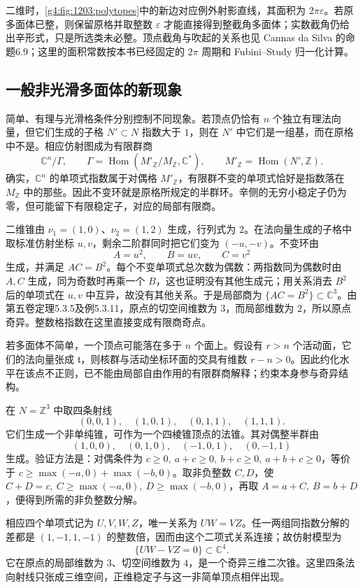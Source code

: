二维时，\cref{g4:fig:1203:polytopes}中的新边对应例外射影直线，其面积为 \(2\pi\varepsilon\)。若原多面体已整，则保留原格并取整数 \(\varepsilon\) 才能直接得到整截角多面体；实数截角仍给出辛形式，只是所选类未必整。顶点截角与吹起的关系也见 Cannas da Silva 的命题6.9；这里的面积常数按本书已经固定的 \(2\pi\) 周期和 Fubini--Study 归一化计算。\cite[第6.4节，第172页]{Cannas2006Symplectic}

\subsection{一般非光滑多面体的新现象}
\label{g4:subsec:1205:04}

简单、有理与光滑格条件分别控制不同现象。若顶点仍恰有 \(n\) 个独立有理法向量，但它们生成的子格
\(N'\subset N\) 指数大于 \(1\)，则在 \(N'\) 中它们是一组基，而在原格中不是。相应仿射图成为有限群商
\[
	\mathbb C^n/\Gamma,\qquad
	\Gamma=\operatorname{Hom}(M'_{\mathbb Z}/M_{\mathbb Z},\mathbb C^*),
	\qquad M'_{\mathbb Z}=\operatorname{Hom}(N',\mathbb Z).
\]
确实，\(\mathbb C^n\) 的单项式指数属于对偶格 \(M'_{\mathbb Z}\)，有限群不变的单项式恰好是指数落在 \(M_{\mathbb Z}\) 中的那些。因此不变环就是原格所规定的半群环。辛侧的无穷小稳定子仍为零，但可能留下有限稳定子，对应的局部有限商。

\begin{example}\label{g4:exm:1205:finite-quotient-cone}
	二维锥由 \(\nu_1=(1,0)\)、\(\nu_2=(1,2)\) 生成，行列式为 \(2\)。在法向量生成的子格中取标准仿射坐标 \(u,v\)，剩余二阶群同时把它们变为 \((-u,-v)\)。不变环由
	\[
		A=u^2,\qquad B=uv,\qquad C=v^2
	\]
	生成，并满足 \(AC=B^2\)。每个不变单项式总次数为偶数：两指数同为偶数时由 \(A,C\) 生成，同为奇数时再乘一个 \(B\)，这也证明没有其他生成元；用关系消去 \(B^2\) 后的单项式在 \(u,v\) 中互异，故没有其他关系。于是局部商为
	\(\{AC=B^2\}\subset\mathbb C^3\)。由第五卷定理5.3.5及例5.3.11，原点的切空间维数为 \(3\)，而局部维数为 \(2\)，所以原点奇异。整数格指数在这里直接变成有限商奇点。
\end{example}

若多面体不简单，一个顶点可能落在多于 \(n\) 个面上。假设有 \(r>n\) 个活动面，它们的法向量张成 \(\mathfrak t\)，则核群与活动坐标环面的交具有维数 \(r-n>0\)。因此约化水平在该点不正则，已不能由局部自由作用的有限群商解释；约束本身参与奇异结构。

\begin{example}\label{g4:exm:1205:nonsimple-cone}
	在 \(N=\mathbb Z^3\) 中取四条射线
	\[
		(0,0,1),\quad(1,0,1),\quad(0,1,1),\quad(1,1,1).
	\]
	它们生成一个非单纯锥，可作为一个四棱锥顶点的法锥。其对偶整半群由
	\[
		(1,0,0),\quad(0,1,0),\quad(-1,0,1),\quad(0,-1,1)
	\]
	生成。验证方法是：对偶条件为
	\(c\ge0,\ a+c\ge0,\ b+c\ge0,\ a+b+c\ge0\)，等价于
	\(c\ge\max(-a,0)+\max(-b,0)\)。取非负整数 \(C,D\)，使
	\(C+D=c,\ C\ge\max(-a,0),\ D\ge\max(-b,0)\)，再取
	\(A=a+C,\ B=b+D\)，便得到所需的非负整数分解。

	相应四个单项式记为 \(U,V,W,Z\)，唯一关系为 \(UW=VZ\)。任一两组同指数分解的差都是 \((1,-1,1,-1)\) 的整数倍，因而由这个二项式关系连接；故仿射模型为
	\[
		\{UW-VZ=0\}\subset\mathbb C^4.
	\]
	它在原点的局部维数为 \(3\)、切空间维数为 \(4\)，是一个奇异三维二次锥。这里四条法向射线只张成三维空间，正维稳定子与这一非简单顶点相伴出现。
\end{example}

